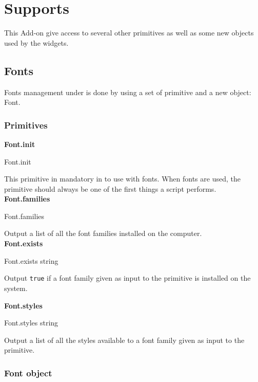 \chapter{Supports}

This Add-on give access to several other primitives as well as some new objects used by the widgets.

\section{Fonts}

Fonts management under \squirrel is done by using a set of primitive and a new object: Font.

\subsection{Primitives}

{\bf Font.init} 
\begin{verbatimtab}
Font.init
\end{verbatimtab}
This primitive in mandatory in \squirrel to use with fonts.  When fonts are used, the primitive should always be one of the first things a script performs.\\

{\bf Font.families} 
\begin{verbatimtab}
Font.families
\end{verbatimtab}
Output a list of all the font families installed on the computer.\\

\cbstart
{\bf Font.exists} 
\begin{verbatimtab}
Font.exists string
\end{verbatimtab}
Output {\tt true} if a font family given as input to the primitive is installed on the system.\\
\cbend

{\bf Font.styles} 
\begin{verbatimtab}
Font.styles string
\end{verbatimtab}
Output a list of all the styles available to a font family given as input to the primitive.\\

\subsection{Font object}

